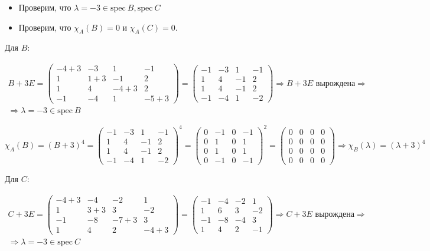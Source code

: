 \documentclass[11pt]{article}
\begin{document}
\begin{itemize}
  \item Проверим, что $\lambda = -3 \in \text{spec} \ B, \text{spec} \ C$
  \item Проверим, что $\chi_A(B) = 0$ и $\chi_A(C) = 0$.
\end{itemize}

Для $B$:

$$
\begin{gathered}
B + 3E =
\begin{pmatrix}
-4 + 3 & -3 & 1 & -1 \\
1 & 1 + 3 & -1 & 2 \\
1 & 4 & -4 + 3 & 2 \\
-1 & -4 & 1 & -5 + 3
\end{pmatrix} = 
\begin{pmatrix}
-1 & -3 & 1 & -1 \\
1 & 4 & -1 & 2 \\
1 & 4 & -1 & 2 \\
-1 & -4 & 1 & -2
\end{pmatrix} \Rightarrow B + 3E \text{ вырождена} \Rightarrow \\[6pt] \Rightarrow \lambda = -3 \in \text{spec} \ B
\end{gathered}
$$

$$
\chi_A(B) = (B + 3)^4 = 
\begin{pmatrix}
-1 & -3 & 1 & -1 \\
1 & 4 & -1 & 2 \\
1 & 4 & -1 & 2 \\
-1 & -4 & 1 & -2
\end{pmatrix}^4 =
\begin{pmatrix}
0 & -1 & 0 & -1 \\
0 & 1 & 0 & 1 \\
0 & 1 & 0 & 1 \\
0 & -1 & 0 & -1
\end{pmatrix}^2 = 
\begin{pmatrix}
0 & 0 & 0 & 0 \\
0 & 0 & 0 & 0 \\
0 & 0 & 0 & 0 \\
0 & 0 & 0 & 0
\end{pmatrix} \Rightarrow \chi_B(\lambda) = (\lambda + 3)^4
$$

Для $C$:

$$
\begin{gathered}
C + 3E =
\begin{pmatrix}
-4 + 3 & -4 & -2 & 1 \\
1 & 3 + 3 & 3 & -2 \\
-1 & -8 & -7 + 3 & 3 \\
1 & 4 & 2 & -4 + 3
\end{pmatrix} = 
\begin{pmatrix}
-1 & -4 & -2 & 1 \\
1 & 6 & 3 & -2 \\
-1 & -8 & -4 & 3 \\
1 & 4 & 2 & -1
\end{pmatrix} 
\Rightarrow C + 3E \text{ вырождена} \Rightarrow \\[6pt] \Rightarrow \lambda = -3 \in \text{spec} \ C
\end{gathered}
$$
\end{document}
